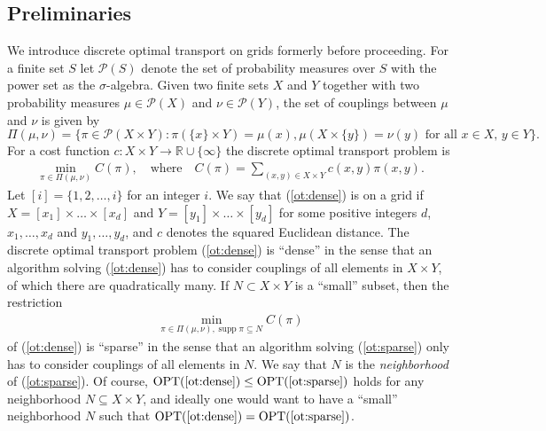 \documentclass[a4paper,UKenglish,cleveref, autoref, thm-restate]{lipics-v2021}
\DeclareMathOperator{\supp}{supp}
\DeclareMathOperator{\OPT}{OPT}
\begin{document}
\subsection{Preliminaries}
We introduce discrete optimal transport on grids formerly before proceeding.
For a finite set $S$ let $\mathcal{P}(S)$ denote the set of probability measures over $S$ with the power set as the $\sigma$-algebra.
Given two finite sets $X$ and $Y$ together with two probability measures $\mu \in \mathcal{P}(X)$ and $\nu \in \mathcal{P}(Y)$, the set of couplings between $\mu$ and $\nu$ is given by
\[
\Pi(\mu,\nu) = \{\pi \in \mathcal{P}(X \times Y): \pi(\{x\} \times Y) = \mu(x), \mu(X \times \{y\}) = \nu(y) \text{ for all $x \in X$, $y \in Y$}\}.
\]
For a cost function $c: X \times Y \rightarrow \mathbb{R} \cup \{\infty\}$ the discrete optimal transport problem is
\begin{align}\tag{$P$}\label{ot:dense}
\min_{\pi \in \Pi(\mu,\nu)} C(\pi), \quad\text{where}\quad C(\pi) = \sum_{(x,y) \in X \times Y} c(x,y)\pi(x,y).
\end{align}
Let $[i] = \{1, 2, \dots, i\}$ for an integer $i$.
We say that (\ref{ot:dense}) is on a grid if $X = [x_1] \times \dots \times [x_d]$ and $Y = [y_1] \times \dots \times [y_d]$ for some positive integers $d$, $x_1, \dots, x_d$ and $y_1, \dots, y_d$, and $c$ denotes the squared Euclidean distance.
The discrete optimal transport problem (\ref{ot:dense}) is ``dense'' in the sense that an algorithm solving (\ref{ot:dense}) has to consider couplings of all elements in $X \times Y$, of which there are quadratically many.
If $N \subset X \times Y$ is a ``small'' subset, then the restriction
\begin{align}\tag{$P'$}\label{ot:sparse}
\min_{\pi \in \Pi(\mu,\nu), \supp \pi \subseteq N} C(\pi)
\end{align}
of (\ref{ot:dense}) is ``sparse'' in the sense that an algorithm solving (\ref{ot:sparse}) only has to consider couplings of all elements in $N$.
We say that $N$ is the \emph{neighborhood} of (\ref{ot:sparse}).
Of course, $\OPT(\text{\ref{ot:dense}}) \leq \OPT(\text{\ref{ot:sparse}})$ holds for any neighborhood $N \subseteq X \times Y$, and ideally one would want to have a ``small'' neighborhood $N$ such that $\OPT(\text{\ref{ot:dense}}) = \OPT(\text{\ref{ot:sparse}})$.
\end{document}
